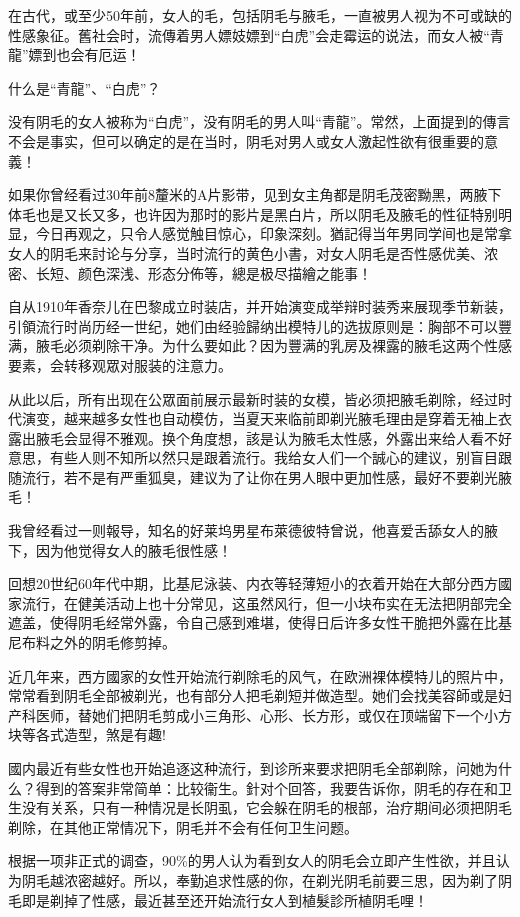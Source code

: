 \documentclass[12pt,UTF8]{ctexbook}
\begin{document}
在古代，或至少50年前，女人的毛，包括阴毛与腋毛，一直被男人视为不可或缺的性感象征。舊社会时，流傳着男人嫖妓嫖到“白虎”会走霉运的说法，而女人被“青龍”嫖到也会有厄运！

什么是“青龍”、“白虎”？

没有阴毛的女人被称为“白虎”，没有阴毛的男人叫“青龍”。常然，上面提到的傳言不会是事实，但可以确定的是在当时，阴毛对男人或女人激起性欲有很重要的意義！

如果你曾经看过30年前8釐米的A片影带，见到女主角都是阴毛茂密黝黑，两腋下体毛也是又长又多，也许因为那时的影片是黑白片，所以阴毛及腋毛的性征特别明显，今日再观之，只令人感觉触目惊心，印象深刻。猶記得当年男同学间也是常拿女人的阴毛来討论与分享，当时流行的黄色小書，对女人阴毛是否性感优美、浓密、长短、颜色深浅、形态分佈等，總是极尽描繪之能事！

自从1910年香奈儿在巴黎成立时装店，并开始演变成举辩时装秀来展现季节新装，引領流行时尚历经一世纪，她们由经验歸纳出模特儿的选拔原则是：胸部不可以豐满，腋毛必须剃除干净。为什么要如此？因为豐满的乳房及裸露的腋毛这两个性感要素，会转移观眾对服装的注意力。

从此以后，所有出现在公眾面前展示最新时装的女模，皆必须把腋毛剃除，经过时代演变，越来越多女性也自动模仿，当夏天来临前即剃光腋毛理由是穿着无袖上衣露出腋毛会显得不雅观。换个角度想，該是认为腋毛太性感，外露出来给人看不好意思，有些人则不知所以然只是跟着流行。我给女人们一个誠心的建议，别盲目跟随流行，若不是有严重狐臭，建议为了让你在男人眼中更加性感，最好不要剃光腋毛！

我曾经看过一则報导，知名的好莱坞男星布萊德彼特曾说，他喜爱舌舔女人的腋下，因为他觉得女人的腋毛很性感！

回想20世纪60年代中期，比基尼泳装、内衣等轻薄短小的衣着开始在大部分西方國家流行，在健美活动上也十分常见，这虽然风行，但一小块布实在无法把阴部完全遮盖，使得阴毛经常外露，令自己感到难堪，使得日后许多女性干脆把外露在比基尼布料之外的阴毛修剪掉。

近几年来，西方國家的女性开始流行剃除毛的风气，在欧洲裸体模特儿的照片中，常常看到阴毛全部被剃光，也有部分人把毛剃短并做造型。她们会找美容師或是妇产科医师，替她们把阴毛剪成小三角形、心形、长方形，或仅在顶端留下一个小方块等各式造型，煞是有趣!

國内最近有些女性也开始追逐这种流行，到诊所来要求把阴毛全部剃除，问她为什么？得到的答案非常简单：比较衞生。針对个回答，我要告诉你，阴毛的存在和卫生没有关系，只有一种情况是长阴虱，它会躲在阴毛的根部，治疗期间必须把阴毛剃除，在其他正常情况下，阴毛并不会有任何卫生问题。

根据一项非正式的调查，90\%的男人认为看到女人的阴毛会立即产生性欲，并且认为阴毛越浓密越好。所以，奉勤追求性感的你，在剃光阴毛前要三思，因为剃了阴毛即是剃掉了性感，最近甚至还开始流行女人到植髮診所植阴毛哩！
\end{document}
